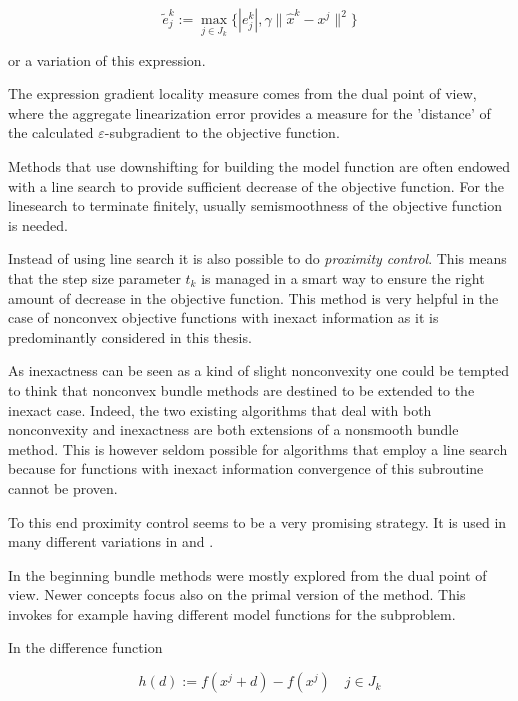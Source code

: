 \begin{equation}
	\tilde{e}_j^k := \max_{j \in J_k} \{|e_j^k|,\gamma \|\hat{x}^k-x^j\|^2\}
\label{subgr_loc_measure}
\end{equation}

or a variation of this expression.

The expression gradient locality measure comes from the dual point of view, where the aggregate linearization error provides a measure for the 'distance' of the calculated \(\varepsilon\)-subgradient to the objective function.

Methods that use downshifting for building the model function are often endowed with a line search to provide sufficient decrease of the objective function. For the linesearch to terminate finitely, usually semismoothness of the objective function is needed.

Instead of using line search it is also possible to do \emph{proximity control}. This means that the step size parameter \(t_k\) is managed in a smart way to ensure the right amount of decrease in the objective function. This method is very helpful in the case of nonconvex objective functions with inexact information as it is predominantly considered in this thesis.

As inexactness can be seen as a kind of slight nonconvexity one could be tempted to think that nonconvex bundle methods are destined to be extended to the inexact case. Indeed, the two existing algorithms \cite{Hare2016,Noll2013} that deal with both nonconvexity and inexactness are both extensions of a nonsmooth bundle method.
This is however seldom possible for algorithms that employ a line search because for functions with inexact information convergence of this subroutine cannot be proven.

To this end proximity control seems to be a very promising strategy. It is used in many different variations in \cite{Apkarian2008, Lewis2015, Noll2010, Noll2005, Noll2012} and \cite{Schramm1992}.

In the beginning bundle methods were mostly explored from the  dual point of view. Newer concepts focus also on the primal version of the method. This invokes for example having different model functions for the subproblem.

In \cite{Fuduli2004, Fuduli2004a} the difference function 

\begin{equation}
	h(d):= f(x^j +d) -f(x^j) \quad j \in J_k
\label{diff_fun}
\end{equation}

